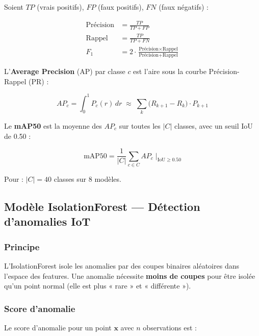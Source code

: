 Soient $TP$ (vrais positifs), $FP$ (faux positifs), $FN$ (faux négatifs) :

\begin{align}
\text{Précision} &= \frac{TP}{TP + FP} \label{eq:precision} \\[4pt]
\text{Rappel}    &= \frac{TP}{TP + FN}  \label{eq:recall}   \\[4pt]
F_1              &= 2 \cdot \frac{\text{Précision} \times \text{Rappel}}
                              {\text{Précision} + \text{Rappel}} \label{eq:f1}
\end{align}

L'\textbf{Average Precision} (AP) par classe $c$ est l'aire sous la courbe
Précision-Rappel (PR) :

\begin{equation}
AP_c = \int_0^1 P_c(r)\,dr \;\approx\; \sum_{k} \bigl(R_{k+1} - R_k\bigr) \cdot P_{k+1}
\label{eq:ap}
\end{equation}

Le \textbf{mAP50} est la moyenne des $AP_c$ sur toutes les $|C|$ classes, avec un
seuil IoU de 0.50 :

\begin{equation}
\boxed{
\text{mAP50} = \frac{1}{|C|} \sum_{c \in C} AP_c \;\Big|_{\text{IoU} \geq 0.50}
}
\label{eq:map50}
\end{equation}

Pour \farmAI{} : $|C| = 40$ classes sur 8 modèles.

\subsection{Modèle IsolationForest — Détection d'anomalies IoT}

\subsubsection{Principe}

L'IsolationForest \cite{liu2008isolation} isole les anomalies par des coupes binaires
aléatoires dans l'espace des features. Une anomalie nécessite \textbf{moins de coupes}
pour être isolée qu'un point normal (elle est plus « rare » et « différente »).

\subsubsection{Score d'anomalie}

Le score d'anomalie pour un point $\mathbf{x}$ avec $n$ observations est :

